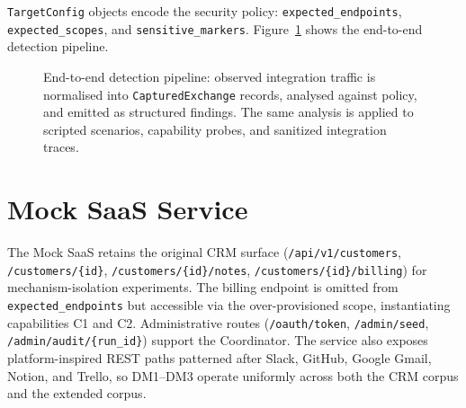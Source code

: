 \documentclass[12pt,a4paper]{report}
\begin{document}
\texttt{TargetConfig} objects encode the security policy: \texttt{expected\_endpoints},
\texttt{expected\_scopes}, and \texttt{sensitive\_markers}. Figure~\ref{fig:pipeline} shows the
end-to-end detection pipeline.

\begin{figure}[H]
    \centering
    \caption{End-to-end detection pipeline: observed integration traffic is normalised into
             \texttt{CapturedExchange} records, analysed against policy, and emitted as
             structured findings. The same analysis is applied to scripted scenarios, capability
             probes, and sanitized integration traces.}
    \label{fig:pipeline}
\end{figure}

\section{Mock SaaS Service}

The Mock SaaS retains the original CRM surface (\texttt{/api/v1/customers},
\texttt{/customers/\{id\}}, \texttt{/customers/\{id\}/notes},
\texttt{/customers/\{id\}/billing}) for mechanism-isolation experiments. The billing endpoint is
omitted from \texttt{expected\_endpoints} but accessible via the over-provisioned scope,
instantiating capabilities C1 and C2. Administrative routes (\texttt{/oauth/token},
\texttt{/admin/seed}, \texttt{/admin/audit/\{run\_id\}}) support the Coordinator. The service
also exposes platform-inspired REST paths patterned after Slack, GitHub, Google Gmail, Notion,
and Trello, so DM1--DM3 operate uniformly across both the CRM corpus and the extended corpus.
\end{document}
